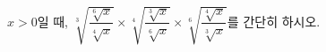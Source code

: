 $x>0$일 때, $\sqrt[3]{\dfrac{\sqrt[6]{x}}{\sqrt[4]{x}}}\times\sqrt[4]{\dfrac{\sqrt[3]{x}}{\sqrt[6]{x}}}\times\sqrt[6]{\dfrac{\sqrt[4]{x}}{\sqrt[3]{x}}}$를 간단히 하시오.

